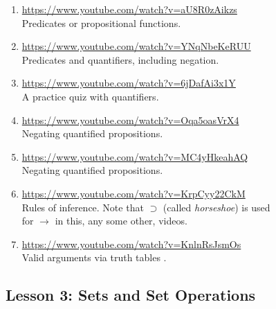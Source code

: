 \documentclass[11pt]{amsart}
\begin{document}
\begin{enumerate}

\item \url{https://www.youtube.com/watch?v=aU8R0zAikzs}\\
Predicates or propositional functions.\\[5pt]

\item \url{https://www.youtube.com/watch?v=YNqNbeKeRUU}\\
Predicates and quantifiers, including negation.\\[5pt]

\item \url{https://www.youtube.com/watch?v=6jDafAi3x1Y}\\
A practice quiz with quantifiers.\\[5pt]

\item \url{https://www.youtube.com/watch?v=Oqa5oasVrX4}\\
Negating quantified propositions.\\[5pt]

\item \url{https://www.youtube.com/watch?v=MC4yHkeahAQ}\\
Negating quantified propositions.\\[5pt]

\item \url{https://www.youtube.com/watch?v=KrpCyy22CkM}\\
Rules of inference. Note that $\supset$ (called {\it horseshoe}) is used\\
 for $\to$ in this, any some other, videos.\\[5pt]

\item \url{https://www.youtube.com/watch?v=KnlnRsJsmOs}\\
Valid arguments via truth tables .\\[5pt]

\end{enumerate}

\subsection{Lesson 3: Sets and Set Operations}
\end{document}
